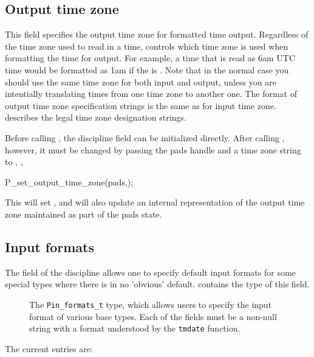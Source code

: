 \subsection{Output time zone}
\label{sec:library-customization-output-time-zone}
This field specifies the output time zone for formatted time output.
Regardless of the time zone used to read in a time,
 controls which time zone is used when
formatting the time for output.  For example, a time that is read as 6am UTC time
would be formatted as 1am if the  is .
Note that in the normal case you should use the same time zone
for both input and output, unless you are intentially translating
times from one time zone to another one. The format of output time
zone specification strings is the same as for input time zone.
 describes the legal time zone designation strings.

Before calling , the discipline field 
can be initialized directly.  After calling , however, it
must be changed by passing the pads handle and a time zone string to 
, \eg{},

\begin{centercode}
    P\_set\_output\_time\_zone(pads,);
\end{centercode}

This will set , and will also update
an internal representation of the output time zone maintained as part of
the pads state.

\subsection{Input formats}
\label{sec:library-customization-input-formats}
The  field of the discipline allows one to specify
default input formats for some special types where there is 
in no 'obvious' default.  contains the type
of this field.
\begin{figure}
\caption{The \texttt{Pin\_formats\_t} type, which allows users to specify the
  input format of various \pads{} base types. Each of the fields must
  be a non-null string with a format understood by the \texttt{tmdate} function.}
\label{fig:input-formats}
\end{figure}
The current entries are:

